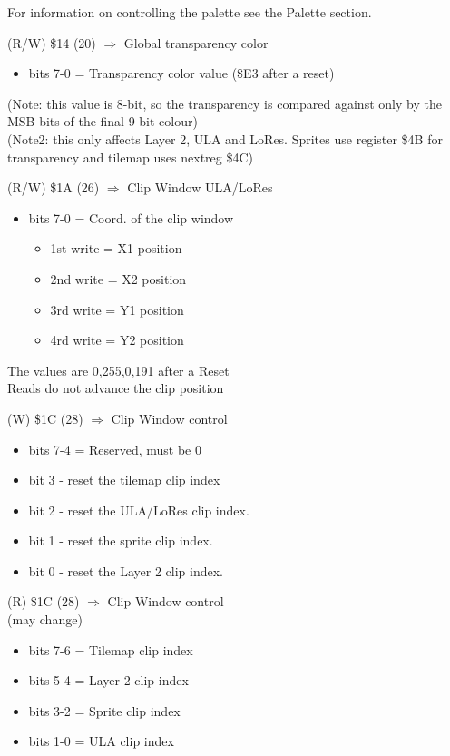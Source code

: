 For information on controlling the palette see the Palette section.

(R/W) \$14 (20) $\Rightarrow$ Global transparency color
\begin{itemize}
\item[] bits 7-0 = Transparency color value (\$E3 after a reset)
\end{itemize}
(Note: this value is 8-bit, so the transparency is compared against
only by the MSB bits of the final 9-bit colour)\\
(Note2: this only affects Layer 2, ULA and LoRes. Sprites use register
\$4B for transparency and tilemap uses nextreg \$4C)

(R/W) \$1A (26) $\Rightarrow$ Clip Window ULA/LoRes
\begin{itemize}
\item[] bits 7-0 = Coord. of the clip window
  \begin{itemize}
  \item[] 1st write = X1 position
  \item[] 2nd write = X2 position
  \item[] 3rd write = Y1 position
  \item[] 4rd write = Y2 position
  \end{itemize}
\end{itemize}
The values are 0,255,0,191 after a Reset\\
Reads do not advance the clip position

(W) \$1C (28) $\Rightarrow$ Clip Window control
\begin{itemize}
\item[] bits 7-4 = Reserved, must be 0
\item[] bit 3 - reset the tilemap clip index
\item[] bit 2 - reset the ULA/LoRes clip index.
\item[] bit 1 - reset the sprite clip index.
\item[] bit 0 - reset the Layer 2 clip index.
\end{itemize}

(R) \$1C (28) $\Rightarrow$ Clip Window control\\
(may change)
\begin{itemize}
\item[] bits 7-6 = Tilemap clip index
\item[] bits 5-4 = Layer 2 clip index
\item[] bits 3-2 = Sprite clip index
\item[] bits 1-0 = ULA clip index
\end{itemize}

